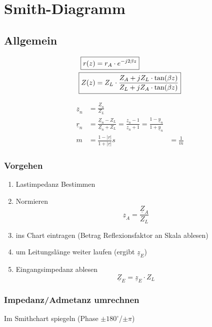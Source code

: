 \section{Smith-Diagramm}

\subsection{Allgemein} \label{sec:Smith_All}
\begin{center}
    \begin{align*}
        \Aboxed{r(z) & = r_A \cdot e^{-j2\beta z}}                                              \\
        \Aboxed{Z(z) & = Z_L\cdot\frac{Z_A+jZ_L\cdot\tan(\beta z)}{Z_L+jZ_A\cdot\tan(\beta z)}}
    \end{align*}
    
\end{center}
\begin{align*}
    \underline{z}_n & = \frac{\underline{Z}_n}{Z_L}                                                                                                                   \\
    \underline{r}_n & = \frac{\underline{Z}_n-Z_L}{\underline{Z}_n+Z_L}= \frac{\underline{z}_n-1}{\underline{z}_n+1}    = \frac{1-\underline{y}_n}{1+\underline{y}_n} \\
    m               & = \frac{1-|\underline{r}|}{1+|\underline{r}|}
    s               & = \frac{1}{m}
\end{align*}

\subsubsection{Vorgehen}
\begin{enumerate}
    \item Lastimpedanz Bestimmen
    \item Normieren
          \[\underline{z}_A = \frac{\underline{Z}_A}{Z_L} \]
    \item ins Chart eintragen (Betrag Reflexionsfaktor an Skala ablesen)
    \item um Leitungslänge weiter laufen (ergibt $\underline{z}_E$)
    \item Eingangsimpedanz ablesen
          \[\underline{Z}_E = \underline{z}_E \cdot Z_L\]
\end{enumerate}

\subsubsection{Impedanz/Admetanz umrechnen}
Im Smithchart spiegeln (Phase $\pm 180^{\circ}$/$\pm \pi$)